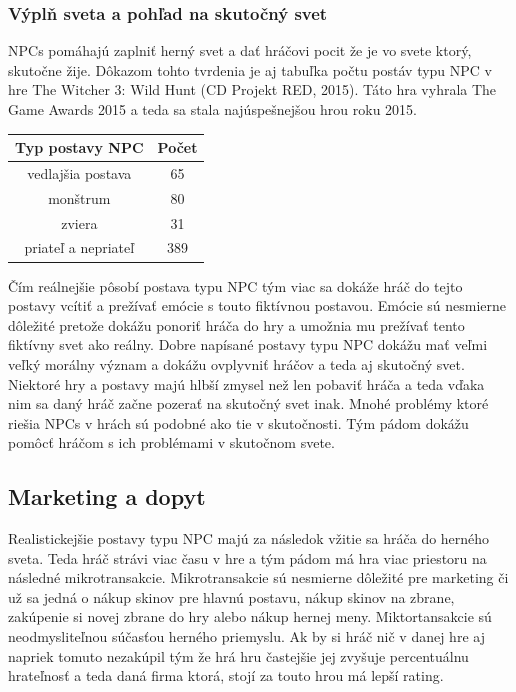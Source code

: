 \documentclass[10pt,twoside,slovak,a4paper]{article}
\begin{document}
\subsubsection{Výplň sveta a pohľad na skutočný svet}
NPCs pomáhajú zaplniť herný svet a dať hráčovi pocit že je vo svete ktorý,
skutočne žije. Dôkazom tohto tvrdenia je aj tabuľka počtu postáv typu NPC v hre The Witcher 3: Wild Hunt (CD Projekt RED, 2015). Táto hra vyhrala The Game Awards 2015 a teda sa stala najúspešnejšou hrou roku 2015. 


\begin{center}

\hfill \break
    
\begin{tabular}{|c|c|}
    
     \hline
     Typ postavy NPC & Počet\\
     \hline
     vedlajšia postava & 65\\
    \hline
    monštrum & 80\\
    \hline
    zviera & 31\\
    \hline
    priateľ a nepriateľ &389\\
    \hline

\end{tabular}

\hfill \break

\end{center}




Čím reálnejšie pôsobí postava typu NPC tým viac sa dokáže hráč do tejto postavy vcítiť a prežívať emócie s touto fiktívnou postavou. Emócie sú nesmierne dôležité pretože dokážu ponoriť hráča do hry a umožnia mu prežívať tento fiktívny svet ako reálny. Dobre napísané postavy typu NPC dokážu mať veľmi veľký morálny význam a dokážu ovplyvniť hráčov a teda aj skutočný svet. Niektoré hry a postavy majú hlbší zmysel než len pobaviť hráča a teda vďaka nim sa daný hráč začne pozerať na skutočný svet inak. Mnohé problémy ktoré riešia NPCs v hrách sú podobné ako tie v skutočnosti. Tým pádom dokážu pomôcť hráčom s ich problémami v skutočnom svete. 

\subsection{Marketing a dopyt}
Realistickejšie postavy typu NPC majú za následok vžitie sa hráča do herného sveta. Teda hráč strávi viac času v hre a tým pádom má hra viac priestoru na následné mikrotransakcie. Mikrotransakcie sú nesmierne dôležité pre marketing či už sa jedná o nákup skinov pre hlavnú postavu, nákup skinov na zbrane, zakúpenie si novej zbrane do hry alebo nákup hernej meny. Miktortansakcie sú neodmysliteľnou súčasťou herného priemyslu. 
Ak by si hráč nič v danej hre aj napriek tomuto nezakúpil tým že hrá hru častejšie jej zvyšuje percentuálnu hrateľnosť a teda daná firma ktorá, stojí za touto hrou má lepší rating.
\end{document}
